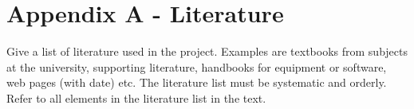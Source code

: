 \section{Appendix A - Literature}
Give a list of literature used in the project. Examples are textbooks from subjects at the university, supporting literature, handbooks for equipment or software, web pages (with date) etc. The literature list must be systematic and orderly. Refer to all elements in the literature list in the text.

\pagebreak